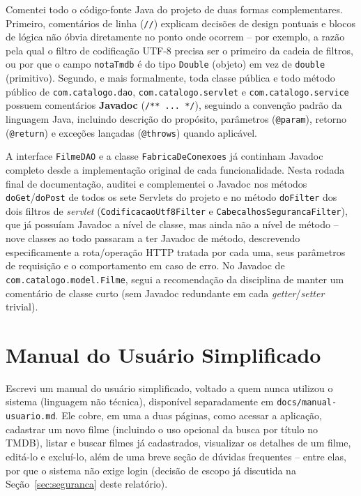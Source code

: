 \documentclass[12pt,a4paper]{article}
\begin{document}
Comentei todo o código-fonte Java do projeto de duas formas complementares. Primeiro,
comentários de linha (\texttt{//}) explicam decisões de design pontuais e blocos de lógica não
óbvia diretamente no ponto onde ocorrem -- por exemplo, a razão pela qual o filtro de codificação
UTF-8 precisa ser o primeiro da cadeia de filtros, ou por que o campo \texttt{notaTmdb} é do tipo
\texttt{Double} (objeto) em vez de \texttt{double} (primitivo). Segundo, e mais formalmente, toda
classe pública e todo método público de \texttt{com.catalogo.dao}, \texttt{com.catalogo.servlet}
e \texttt{com.catalogo.service} possuem comentários \textbf{Javadoc} (\texttt{/** ... */}),
seguindo a convenção padrão da linguagem Java, incluindo descrição do propósito, parâmetros
(\texttt{@param}), retorno (\texttt{@return}) e exceções lançadas (\texttt{@throws}) quando
aplicável.

A interface \texttt{FilmeDAO} e a classe \texttt{FabricaDeConexoes} já continham Javadoc completo
desde a implementação original de cada funcionalidade. Nesta rodada final de documentação,
auditei e complementei o Javadoc nos métodos \texttt{doGet}/\texttt{doPost} de todos os sete
Servlets do projeto e no método \texttt{doFilter} dos dois filtros de \textit{servlet}
(\texttt{CodificacaoUtf8Filter} e \texttt{CabecalhosSegurancaFilter}), que já possuíam Javadoc a
nível de classe, mas ainda não a nível de método -- nove classes ao todo passaram a ter Javadoc
de método, descrevendo especificamente a rota/operação HTTP tratada por cada uma, seus
parâmetros de requisição e o comportamento em caso de erro. No Javadoc de
\texttt{com.catalogo.model.Filme}, segui a recomendação da disciplina de manter um comentário de
classe curto (sem Javadoc redundante em cada \textit{getter}/\textit{setter} trivial).

\section{Manual do Usuário Simplificado}

Escrevi um manual do usuário simplificado, voltado a quem nunca utilizou o sistema (linguagem
não técnica), disponível separadamente em \texttt{docs/manual-usuario.md}. Ele cobre, em uma a
duas páginas, como acessar a aplicação, cadastrar um novo filme (incluindo o uso opcional da
busca por título no TMDB), listar e buscar filmes já cadastrados, visualizar os detalhes de um
filme, editá-lo e excluí-lo, além de uma breve seção de dúvidas frequentes -- entre elas, por que
o sistema não exige login (decisão de escopo já discutida na Seção~\ref{sec:seguranca} deste
relatório).
\end{document}
